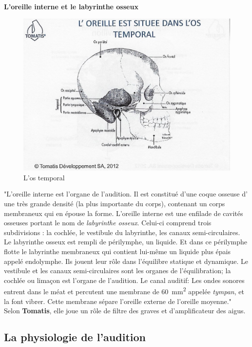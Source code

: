 \textbf{L'oreille interne et le labyrinthe osseux}

\begin{figure}
	\centering
	\includegraphics[width=0.7\linewidth]{images/Loreilleostemporal_crane.jpg}
	\caption[L'os temporal]{L'os temporal}
	\label{fig:loreilleostemporal18}
\end{figure}

"L'oreille interne est l'organe de l'audition. Il
est constitué d'une coque osseuse d' une très grande densité (la plus
importante du corps), contenant un corps membraneux qui en épouse
la forme.
L'oreille interne est une enfilade de cavités osseuses portant
le nom de \emph{labyrinthe osseux}. Celui-ci comprend trois subdivisions :
la cochlée, le vestibule du labyrinthe, les canaux semi-circulaires.
Le labyrinthe
osseux est rempli de périlymphe, un liquide. Et dans ce périlymphe
flotte le labyrinthe membraneux qui contient lui-même un liquide
plus épais appelé endolymphe. Ils jouent leur rôle dans l'équilibre
statique et dynamique. Le vestibule et les canaux semi-circulaires
sont les organes de l'équilibration; la cochlée ou
limaçon est l'organe de l'audition.
Le canal auditif:
Les ondes sonores entrent dans le méat et percutent
une membrane de \SI{60}{\milli\metre\squared} appelée \emph{tympan}, et la font vibrer. Cette membrane
sépare l'oreille externe de l'oreille moyenne."\autocite[ch. 8, pp. 319--321.]{marieb:biologie}
Selon \textbf{Tomatis}, elle
joue un rôle de filtre des graves et d'amplificateur des aigus.



\subsection{La physiologie de l'audition}

